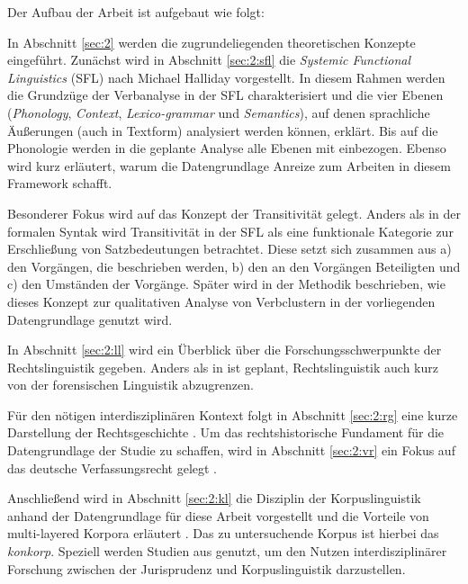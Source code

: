 Der Aufbau der Arbeit ist aufgebaut wie folgt:

In Abschnitt \ref{sec:2} werden die zugrundeliegenden theoretischen Konzepte eingeführt. Zunächst wird in Abschnitt \ref{sec:2:sfl} die \textit{Systemic Functional Linguistics} (SFL) nach Michael Halliday vorgestellt. In diesem Rahmen werden die Grundzüge der Verbanalyse in der SFL charakterisiert und die vier Ebenen (\textit{Phonology}, \textit{Context}, \textit{Lexico-grammar} und \textit{Semantics}), auf denen sprachliche Äußerungen (auch in Textform) analysiert werden können, erklärt. Bis auf die Phonologie werden in die geplante Analyse alle Ebenen mit einbezogen. Ebenso wird kurz erläutert, warum die Datengrundlage Anreize zum Arbeiten in diesem Framework schafft.

Besonderer Fokus wird auf das Konzept der Transitivität gelegt. Anders als in der formalen Syntak wird Transitivität in der SFL als eine funktionale Kategorie zur Erschließung von Satzbedeutungen betrachtet. Diese setzt sich zusammen aus a) den Vorgängen, die beschrieben werden, b) den an den Vorgängen Beteiligten und c) den Umständen der Vorgänge. Später wird in der Methodik beschrieben, wie dieses Konzept zur qualitativen Analyse von Verbclustern in der vorliegenden Datengrundlage genutzt wird.

In Abschnitt \ref{sec:2:ll} wird ein Überblick über die Forschungsschwerpunkte der Rechtslinguistik gegeben. Anders als in \citealt{Thurau2025} ist geplant, Rechtslinguistik auch kurz von der forensischen Linguistik abzugrenzen. %

Für den nötigen interdisziplinären Kontext folgt in Abschnitt \ref{sec:2:rg} eine kurze Darstellung der Rechtsgeschichte \citep{Hähnchen2016}. Um das rechtshistorische Fundament für die Datengrundlage der Studie zu schaffen, wird in Abschnitt \ref{sec:2:vr} ein Fokus auf das deutsche Verfassungsrecht gelegt \citep{WeberFas1983,IpsenEtAl2022}.

Anschließend wird in Abschnitt \ref{sec:2:kl} die Disziplin der Korpuslinguistik anhand der Datengrundlage für diese Arbeit vorgestellt und die Vorteile von multi-layered Korpora erläutert \citep{OdebrechtEtAl2016}. Das zu untersuchende Korpus ist hierbei das \textit{konkorp}. Speziell werden Studien aus \citealt{VogelEtAl2022} genutzt, um den Nutzen interdisziplinärer Forschung zwischen der Jurisprudenz und Korpuslinguistik darzustellen.

